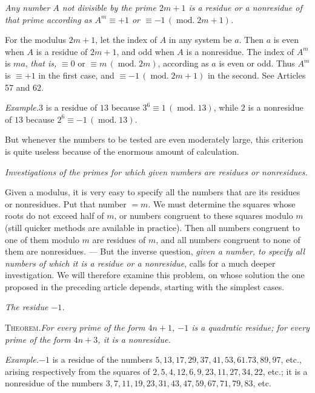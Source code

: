 \emph{Any number $A$ not divisible by the prime $2m+1$ is a residue or a nonresidue of that prime according as $A^m\equiv+1$ or $\equiv-1\,(\operatorname{mod.}2m+1)$.}

For the modulus $2m+1$, let the index of $A$ in any system be $a$. Then $a$ is even when $A$ is a residue of $2m+1$, and odd when $A$ is a nonresidue. The index of $A^m$ is $ma$, \emph{that is,} $\equiv0$ or $\equiv m\,(\operatorname{mod.}2m)$, according as $a$ is even or odd. Thus $A^m$ is $\equiv+1$ in the first case, and $\equiv-1\,(\operatorname{mod.}2m+1)$ in the second. See Articles 57 and 62.

\emph{Example.}\quad $3$ is a residue of $13$ because $3^6\equiv1\,(\operatorname{mod.}13)$, while $2$ is a nonresidue of $13$ because $2^6\equiv-1\,(\operatorname{mod.}13)$.

But whenever the numbers to be tested are even moderately large, this criterion is quite useless because of the enormous amount of calculation.

\begin{center}\emph{Investigations of the primes for which given numbers are residues or nonresidues.}\end{center}

Given a modulus, it is very easy to specify all the numbers that are its residues or nonresidues. Put that number $=m$. We must determine the squares whose roots do not exceed half of $m$, or numbers congruent to these squares modulo $m$ (still quicker methods are available in practice). Then all numbers congruent to one of them modulo $m$ are residues of $m$, and all numbers congruent to none of them are nonresidues. --- But the inverse question, \emph{given a number, to specify all numbers of which it is a residue or a nonresidue}, calls for a much deeper investigation. We will therefore examine this problem, on whose solution the one proposed in the preceding article depends, starting with the simplest cases.

\begin{center}\emph{The residue $-1$.}\end{center}

\textsc{Theorem.}\quad \emph{For every prime of the form $4n+1$, $-1$ is a quadratic residue; for every prime of the form $4n+3$, it is a nonresidue.}

\emph{Example.}\quad $-1$ is a residue of the numbers $5,\allowbreak 13,\allowbreak 17,\allowbreak 29,\allowbreak 37,\allowbreak 41,\allowbreak 53,\allowbreak 61.73,\allowbreak 89,\allowbreak 97$, etc., arising respectively from the squares of $2,\allowbreak 5,\allowbreak 4,\allowbreak 12,\allowbreak 6,\allowbreak 9,\allowbreak 23,\allowbreak 11,\allowbreak 27,\allowbreak 34,\allowbreak 22$, etc.; it is a nonresidue of the numbers $3,\allowbreak 7,\allowbreak 11,\allowbreak 19,\allowbreak 23,\allowbreak 31,\allowbreak 43,\allowbreak 47,\allowbreak 59,\allowbreak 67,\allowbreak 71,\allowbreak 79,\allowbreak 83$, etc.

